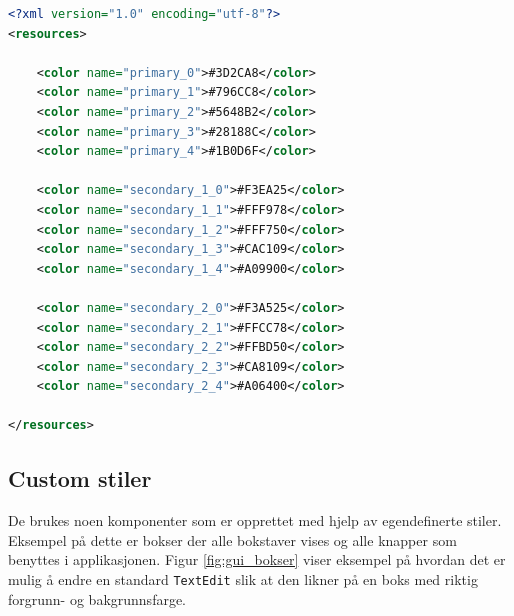 \begin{lstlisting}[language=XML, caption=Fargepalett i colors.xml, label=xml:colors]
<?xml version="1.0" encoding="utf-8"?>
<resources>

    <color name="primary_0">#3D2CA8</color>
    <color name="primary_1">#796CC8</color>
    <color name="primary_2">#5648B2</color>
    <color name="primary_3">#28188C</color>
    <color name="primary_4">#1B0D6F</color>

    <color name="secondary_1_0">#F3EA25</color>
    <color name="secondary_1_1">#FFF978</color>
    <color name="secondary_1_2">#FFF750</color>
    <color name="secondary_1_3">#CAC109</color>
    <color name="secondary_1_4">#A09900</color>

    <color name="secondary_2_0">#F3A525</color>
    <color name="secondary_2_1">#FFCC78</color>
    <color name="secondary_2_2">#FFBD50</color>
    <color name="secondary_2_3">#CA8109</color>
    <color name="secondary_2_4">#A06400</color>

</resources>
\end{lstlisting}






\subsection{Custom stiler}
De brukes noen komponenter som er opprettet med hjelp av egendefinerte stiler. Eksempel på dette er bokser der alle bokstaver vises og alle knapper som benyttes i applikasjonen. Figur \ref{fig:gui_bokser} viser eksempel på hvordan det er mulig å endre en standard \texttt{TextEdit} slik at den likner på en boks med riktig forgrunn- og bakgrunnsfarge.

